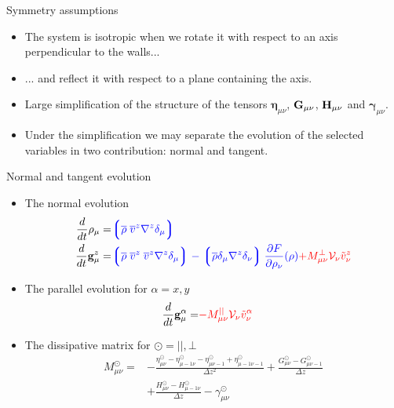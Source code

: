\documentclass{beamer}
\newcommand{\llg}{\left\lgroup}
\newcommand{\rlg}{\right\rgroup}
\begin{document}
\begin{frame}{Symmetry assumptions}
  \begin{itemize}
    \item The system is isotropic when we rotate it with respect to an axis perpendicular to the walls...
    \item ... and reflect it with respect to a plane containing the axis. 
    \item Large simplification of the structure of the tensors $\boldsymbol{\eta}_{\mu\nu}$, ${\bf G}_{\mu\nu}$, ${\bf H}_{\mu\nu}$ and $\boldsymbol{\gamma}_{\mu\nu}$.
    \item Under the simplification we may separate the evolution of the selected variables in two contribution: normal and tangent.
    \end{itemize}
\end{frame}

\begin{frame}{Normal and tangent evolution}
\begin{itemize}
  \item The normal evolution 
\begin{align}
  \frac{d}{dt}\rho_\mu=&  {\color{blue} \llg\overline{\rho} \; \overline{v}^{z}{\nabla}^{z}\delta_\mu \rlg}
\nonumber\\
    \frac{d}{dt}{{\bf g}}^{z}_\mu=&
{\color{blue} \llg\overline{\rho}\; \overline{v}^{z}\;\overline{v}^{z}{\nabla}^{z}\delta_{\mu}\rlg
-\llg\overline{\rho}\delta_{\mu}{\nabla}^{z}\delta_{\nu}\rlg
\frac{\partial  F}{\partial \rho_{\nu}}(\rho)}
{\color{red} +M_{\mu\nu}^{\bot}{\cal V}_\nu\tilde{v}^{z}_\nu}
\nonumber
\end{align}
  \item The parallel evolution for $\alpha=x,y$  
\begin{align}
  \frac{d}{dt}{{\bf g}}^\alpha_\mu=&{\color{red}-M_{\mu\nu}^{||}{\cal V}_\nu\tilde{v}^\alpha_\nu}
\nonumber
\end{align}
\item The dissipative matrix for $\odot=||,\bot$
\begin{align}
M^{\odot}_{\mu\nu} 
=&-\frac{\eta^{\odot}_{\mu\nu}-\eta^{\odot}_{\mu-1\nu}-\eta^{\odot}_{\mu\nu-1}+\eta^{\odot}_{\mu-1\nu-1}}{\Delta z^2}
+\frac{{G}^{\odot}_{\mu\nu}-{G}^{\odot}_{\mu\nu-1}}{\Delta z} \nonumber \\
&+\frac{{H}^{\odot}_{\mu\nu}-{H}^{\odot}_{\mu-1\nu}}{\Delta z}
-{\gamma}^{\odot}_{\mu\nu}
\nonumber
\end{align}
\end{itemize}
\end{frame}
\end{document}
